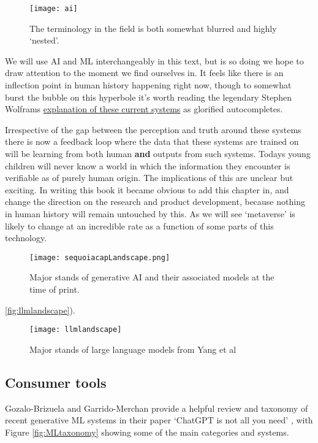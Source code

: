 \begin{figure}[ht]\centering 	\texttt{[image: ai]}
	\caption{The terminology in the field is both somewhat blurred and highly `nested'.}
	\label{fig:aiVenn}
\end{figure}

We will use AI and ML interchangeably in this text, but is so doing we hope to draw attention to the moment we find ourselves in. It feels like there is an inflection point in human history happening right now, though to somewhat burst the bubble on this hyperbole it's worth reading the legendary Stephen Wolframs \href{https://writings.stephenwolfram.com/2023/02/what-is-chatgpt-doing-and-why-does-it-work/}{explanation of these current systems} as glorified autocompletes. \par
Irrespective of the gap between the perception and truth around these systems there is now a feedback loop where the data that these systems are trained on will be learning from both human \textbf{and} outputs from such systems. Todays young children will never know a world in which the information they encounter is verifiable as of purely human origin. The implications of this are unclear but exciting. In writing this book it became obvious to add this chapter in, and change the direction on the research and product development, because nothing in human history will remain untouched by this. As we will see `metaverse' is likely to change at an incredible rate as a function of some parts of this technology. %

\begin{figure}[ht]\centering 	\texttt{[image: sequoiacapLandscape.png]}
	\caption{Major stands of generative AI and their associated models at the time of print.}
	\label{fig:sequoiacapLandscape}
\end{figure}

\ref{fig:llmlandscape}).
\begin{figure}[ht]\centering 	\texttt{[image: llmlandscape]}
	\caption{Major stands of large language models from Yang et al \cite{yang2023harnessing}}
	\label{fig:sequoiacapLandscape}
\end{figure}



\subsection{Consumer tools}
Gozalo-Brizuela and Garrido-Merchan provide a helpful review and taxonomy of recent generative ML systems in their paper `ChatGPT is not all you need' \cite{gozalo2023chatgpt}, with Figure \ref{fig:MLtaxonomy} showing some of the main categories and systems. 

